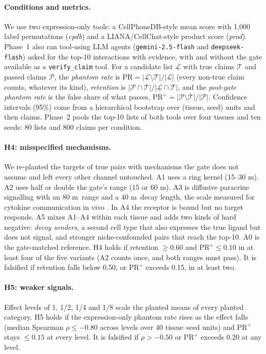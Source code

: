 \documentclass[letterpaper]{article} %
\newcommand{\um}{\ifmmode\,\text{\textmu m}\else\,\textmu m\fi}
\begin{document}
\paragraph{Conditions and metrics.} We use two expression-only tools: a CellPhoneDB-style mean score with 1,000 label
permutations (\emph{cpdb}) and a LIANA/CellChat-style product score (\emph{prod}). Phase~1 also ran tool-using LLM
agents (\texttt{gemini-2.5-flash} and \texttt{deepseek-flash}) asked for the top-10 interactions with evidence, with and
without the gate available as a \texttt{verify\_claim} tool. For a candidate list $\mathcal{L}$ with true claims
$\mathcal{T}$ and passed claims $\mathcal{P}$, the \emph{phantom rate} is
$\mathrm{PR}=|\mathcal{L}\setminus\mathcal{T}|/|\mathcal{L}|$ (every non-true claim counts, whatever its kind),
\emph{retention} is $|\mathcal{P}\cap\mathcal{T}|/|\mathcal{L}\cap\mathcal{T}|$, and the \emph{post-gate phantom
rate} is the false share of what passes, $\mathrm{PR}^{+}=|\mathcal{P}\setminus\mathcal{T}|/|\mathcal{P}|$.
Confidence intervals (95\%) come from a hierarchical bootstrap over (tissue, seed) units and then claims. Phase~2
pools the top-10 lists of both tools over four tissues and ten seeds: 80 lists and 800 claims per condition.

\paragraph{H4: misspecified mechanisms.} We re-planted the targets of true pairs with mechanisms the gate does not
assume and left every other channel untouched. A1 uses a ring kernel (15--30\um). A2 uses half or double the gate's
range (15 or 60\um). A3 is diffusive paracrine signalling with an 80\um\ range and a 40\um\ decay length, the scale
measured for cytokine communication in vivo \cite{oyleryaniv2017}. In A4 the receptor is bound but no target responds.
A5 mixes A1--A4 within each tissue and adds two kinds of hard negative: \emph{decoy senders}, a second cell type that
also expresses the true ligand but does not signal, and stronger niche-confounded pairs that reach the top-10. A0 is
the gate-matched reference. H4 holds if retention $\geq0.60$ and $\mathrm{PR}^{+}\leq0.10$ in at least four of the five
variants (A2 counts once, and both ranges must pass). It is falsified if retention falls below 0.50, or
$\mathrm{PR}^{+}$ exceeds 0.15, in at least two.

\paragraph{H5: weaker signals.} Effect levels of 1, 1/2, 1/4 and 1/8 scale the planted means of every planted
category. H5 holds if the expression-only phantom rate rises as the effect falls (median Spearman $\rho\leq-0.80$
across levels over 40 tissue--seed units) and $\mathrm{PR}^{+}$ stays $\leq0.15$ at every level. It is falsified if
$\rho>-0.50$ or $\mathrm{PR}^{+}$ exceeds 0.20 at any level.
\end{document}
